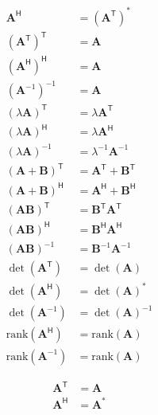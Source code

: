 \noindent\begin{align*}
    \mathbf{A}^\mathsf{H}                  & = {(\mathbf{A}^\mathsf{T})}^*                   \\[.75em]
    {({\mathbf{A}}^\mathsf{T})}^\mathsf{T} & = \mathbf{A}                                    \\
    {({\mathbf{A}}^\mathsf{H})}^\mathsf{H} & = \mathbf{A}                                    \\
    {({\mathbf{A}}^{-1})}^{-1}             & = \mathbf{A}                                    \\[.75em]
    {(\lambda\mathbf{A})}^\mathsf{T}       & = \lambda\mathbf{A}^\mathsf{T}                  \\
    {(\lambda\mathbf{A})}^\mathsf{H}       & = \lambda\mathbf{A}^\mathsf{H}                  \\
    {(\lambda\mathbf{A})}^{-1}             & = \lambda^{-1}\mathbf{A}^{-1}                   \\[.75em]
    {(\mathbf{A}+\mathbf{B})}^\mathsf{T}   & = \mathbf{A}^\mathsf{T} + \mathbf{B}^\mathsf{T} \\
    {(\mathbf{A}+\mathbf{B})}^\mathsf{H}   & = \mathbf{A}^\mathsf{H} + \mathbf{B}^\mathsf{H} \\[.75em]
    {(\mathbf{A}\mathbf{B})}^\mathsf{T}    & = \mathbf{B}^\mathsf{T}\mathbf{A}^\mathsf{T}    \\
    {(\mathbf{A}\mathbf{B})}^\mathsf{H}    & = \mathbf{B}^\mathsf{H}\mathbf{A}^\mathsf{H}    \\
    {(\mathbf{A}\mathbf{B})}^{-1}          & = \mathbf{B}^{-1} \mathbf{A}^{-1}               \\[.75em]
    \det(\mathbf{A}^\mathsf{T})            & = \det(\mathbf{A})                              \\
    \det(\mathbf{A}^\mathsf{H})            & = {\det(\mathbf{A})}^*                          \\
    \det(\mathbf{A}^{-1})                  & = {\det(\mathbf{A})}^{-1}                       \\[.75em]
    \mathrm{rank}{(\mathbf{A}^\mathsf{H})} & = \mathrm{rank}(\mathbf{A})                     \\
    \mathrm{rank}{(\mathbf{A}^{-1} )}      & = \mathrm{rank}(\mathbf{A})
\end{align*}

\noindent\begin{align*}
    {\mathbf{A}}^\mathsf{T} & = \mathbf{A}   \\
    {\mathbf{A}}^\mathsf{H} & = \mathbf{A}^*
\end{align*}

